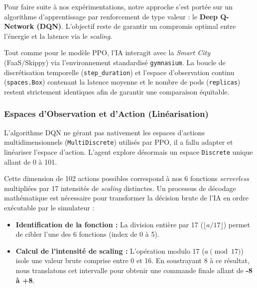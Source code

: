 

\label{sec:dqn}

Pour faire suite à nos expérimentations, notre approche s'est portée sur un algorithme d'apprentissage par renforcement de type valeur : le \textbf{Deep Q-Network (DQN)}. L'objectif reste de garantir un compromis optimal entre l'énergie et la latence via le \textit{scaling}.

Tout comme pour le modèle PPO, l'IA interagit avec la \textit{Smart City} (FaaS/Skippy) via l'environnement standardisé \texttt{gymnasium}. La boucle de discrétisation temporelle (\texttt{step\_duration}) et l'espace d'observation continu (\texttt{spaces.Box}) contenant la latence moyenne et le nombre de pods (\texttt{replicas}) restent strictement identiques afin de garantir une comparaison équitable.

\subsubsection{Espaces d'Observation et d'Action (Linéarisation)}
L'algorithme DQN ne gérant pas nativement les espaces d'actions multidimensionnels (\texttt{MultiDiscrete}) utilisés par PPO, il a fallu adapter et linéariser l'espace d'action. L'agent explore désormais un espace \texttt{Discrete} unique allant de 0 à 101. 

Cette dimension de 102 actions possibles correspond à nos 6 fonctions \textit{serverless} multipliées par 17 intensités de \textit{scaling} distinctes. Un processus de décodage mathématique est nécessaire pour transformer la décision brute de l'IA en ordre exécutable par le simulateur :
\begin{itemize}
    \item \textbf{Identification de la fonction :} La division entière par 17 (\(\lfloor a / 17 \rfloor\)) permet de cibler l'une des 6 fonctions (index de 0 à 5).
    \item \textbf{Calcul de l'intensité de scaling :} L'opération modulo 17 (\(a \pmod{17}\)) isole une valeur brute comprise entre 0 et 16. En soustrayant 8 à ce résultat, nous translatons cet intervalle pour obtenir une commande finale allant de \textbf{-8 à +8}.
\end{itemize}


